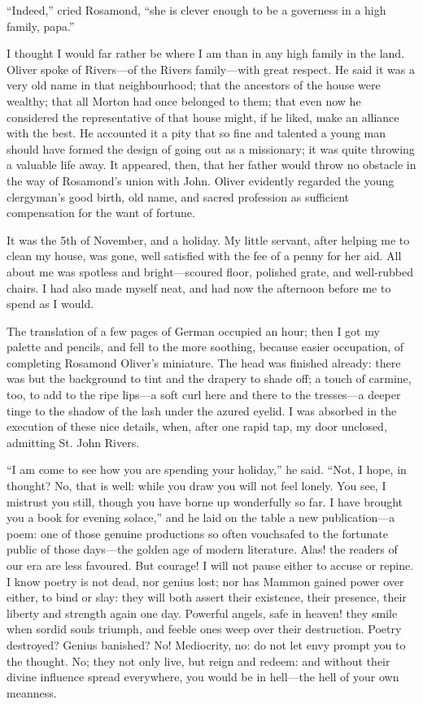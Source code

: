 \enquote{Indeed,} cried Rosamond, \enquote{she is clever enough to be a
governess in a high family, papa.}

I thought I would far rather be where I am than in any high family in
the land. \Mr{} Oliver spoke of \Mr{} Rivers---of the Rivers family---with
great respect. He said it was a very old name in that neighbourhood;
that the ancestors of the house were wealthy; that all Morton had once
belonged to them; that even now he considered the representative of that
house might, if he liked, make an alliance with the best. He accounted
it a pity that so fine and talented a young man should have formed the
design of going out as a missionary; it was quite throwing a valuable
life away. It appeared, then, that her father would throw no obstacle
in the way of Rosamond's union with \St{} John. \Mr{} Oliver evidently
regarded the young clergyman's good birth, old name, and sacred
profession as sufficient compensation for the want of fortune.

It was the 5th of November, and a holiday. My little servant, after
helping me to clean my house, was gone, well satisfied with the fee of a
penny for her aid. All about me was spotless and bright---scoured
floor, polished grate, and well-rubbed chairs. I had also made myself
neat, and had now the afternoon before me to spend as I would.

The translation of a few pages of German occupied an hour; then I got my
palette and pencils, and fell to the more soothing, because easier
occupation, of completing Rosamond Oliver's miniature. The head was
finished already: there was but the background to tint and the drapery
to shade off; a touch of carmine, too, to add to the ripe lips---a soft
curl here and there to the tresses---a deeper tinge to the shadow of the
lash under the azured eyelid. I was absorbed in the execution of these
nice details, when, after one rapid tap, my door unclosed, admitting St.
John Rivers.

\enquote{I am come to see how you are spending your holiday,} he said. 
\enquote{Not, I hope, in thought? No, that is well: while you draw you
will not feel lonely. You see, I mistrust you still, though you have
borne up wonderfully so far. I have brought you a book for evening
solace,} and he laid on the table a new publication---a poem: one of
those genuine productions so often vouchsafed to the fortunate public of
those days---the golden age of modern literature. Alas! the readers of
our era are less favoured. But courage! I will not pause either to
accuse or repine. I know poetry is not dead, nor genius lost; nor has
Mammon gained power over either, to bind or slay: they will both assert
their existence, their presence, their liberty and strength again one
day. Powerful angels, safe in heaven! they smile when sordid souls
triumph, and feeble ones weep over their destruction. Poetry
destroyed? Genius banished? No! Mediocrity, no: do not let envy
prompt you to the thought. No; they not only live, but reign and
redeem: and without their divine influence spread everywhere, you would
be in hell---the hell of your own meanness.

